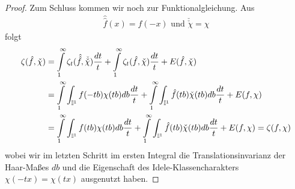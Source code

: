 \begin{proof}
	Zum Schluss kommen wir noch zur Funktionalgleichung. Aus
	\begin{align*}
		\hat{\hat{f}}(x) = f(-x) \text{ und } \check{\check{\chi}} = \chi
	\end{align*}
	folgt
	\begin{align*}
		\zeta(\hat{f},\check{\chi}) 
			&=  \int\displaylimits_1^\infty \zeta_t(\hat{\hat{f}}, \check{\check{\chi}}) \frac{dt}{t} 
				+ \int\displaylimits_1^\infty \zeta_t(\hat{f},\check{\chi}) \frac{dt}{t} + E(\hat{f},\check{\chi})\\
			&= \int\displaylimits_1^\infty \int_{\mathbb{I}^1}f(-tb)\chi(tb)db  \frac{dt}{t} 
				+ \int\displaylimits_1^\infty \int_{\mathbb{I}^1}\hat{f}(tb)\check{\chi}(tb)db  \frac{dt}{t} +E(f,\chi)\\
			&= \int\displaylimits_1^\infty \int_{\mathbb{I}^1}f(tb)\chi(tb)db  \frac{dt}{t} 
				+ \int\displaylimits_1^\infty \int_{\mathbb{I}^1}\hat{f}(tb)\check{\chi}(tb)db  \frac{dt}{t} +E(f,\chi) = \zeta(f,\chi)
	\end{align*}
	wobei wir im letzten Schritt im ersten Integral die Translationsinvarianz der Haar-Maßes $db$ und die Eigenschaft des Idele-Klassencharakters $\chi(-tx) = \chi(tx)$ ausgenutzt haben.
\end{proof}